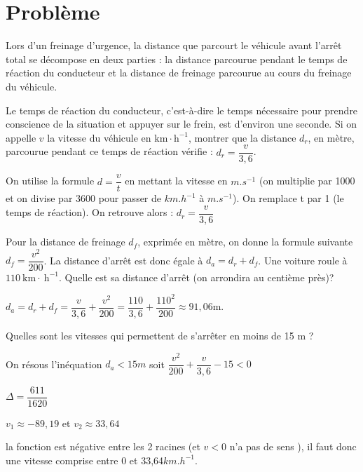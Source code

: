 \documentclass[11pt,a4paper]{article}  %
\begin{document}
\section*{Problème}

Lors d'un freinage d'urgence, la distance que parcourt le véhicule avant l'arrêt total se décompose en deux parties : la distance parcourue pendant le temps de réaction du conducteur et la distance de freinage parcourue au cours du freinage du véhicule.
\begin{enumMet}
	\item Le temps de réaction du conducteur, c'est-à-dire le temps nécessaire pour prendre conscience de la situation et appuyer sur le frein, est d'environ une seconde. Si on appelle $v$ la vitesse du véhicule en $\mathrm{km} \cdot \mathrm{h}^{-1}$, montrer que la distance $d_r$, en mètre, parcourue pendant ce temps de réaction vérifie : $d_r=\dfrac{v}{3,6}$.
	\begin{corrBox}
		On utilise la formule $d=\dfrac{v}{t}$ en mettant la vitesse en $m.s^{-1}$ (on multiplie par 1000 et on divise par 3600 pour passer de $km.h^{-1}$ à $m.s^{-1}$).
		On remplace t par 1 (le temps de réaction). On retrouve alors : $d_r=\dfrac{v}{3,6}$
	\end{corrBox}
	\item Pour la distance de freinage $d_f$, exprimée en mètre, on donne la formule suivante $d_f=\dfrac{v^2}{200}$.
	La distance d'arrêt est donc égale à $d_a=d_r+d_f$.
	Une voiture roule à $110 \mathrm{~km} \cdot \mathrm{~h}^{-1}$. Quelle est sa distance d'arrêt (on arrondira au centième près)?
	\begin{corrBox}
		$d_a=d_r+d_f=\dfrac{v}{3,6}+\dfrac{v^2}{200}=\dfrac{110}{3,6}+\dfrac{110^2}{200}\approx91,06$m.		
	\end{corrBox}
	\item Quelles sont les vitesses qui permettent de s'arrêter en moins de 15 m ?
	\begin{corrBox}
		On résous l'inéquation $d_a<15m$ soit $\dfrac{v^2}{200}+\dfrac{v}{3,6}-15<0$
		
		$\Delta=\dfrac{611}{1620}$
		
		$v_1\approx-89,19$ et $v_2\approx33,64$
		
		la fonction est négative entre les 2 racines (et $v<0$ n'a pas de sens ), il faut donc une vitesse comprise entre 0 et 33,64$km.h^{-1}$.	
	\end{corrBox}
\end{enumMet}
\end{document}
